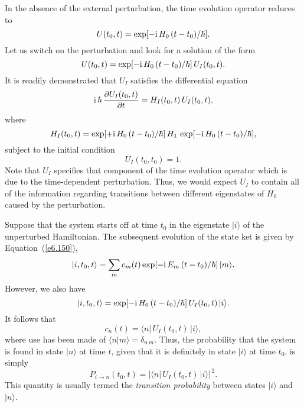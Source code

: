 In the absence of the external perturbation, the time evolution operator
reduces to
\begin{equation}
U(t_0, t) =  \exp[-{\rm i} \, H_0\,(t-t_0)/\hbar].
\end{equation}
Let us switch on the perturbation and look for a solution of the
form
\begin{equation}
U(t_0, t) = \exp[ -{\rm i} \, H_0\,(t-t_0)/\hbar]\, U_I(t_0, t).
\end{equation}
It is readily demonstrated that $U_I$ satisfies the differential
equation
\begin{equation}\label{e6.188}
{\rm i}\, \hbar\, \frac{\partial U_I(t_0, t)}{\partial t} =  H_I(t_0, t)\,
U_I(t_0, t),
\end{equation}
where
\begin{equation}
H_I(t_0,t) = \exp[ +{\rm i} \, H_0\,(t-t_0)/\hbar] \, H_1\,
\exp[ -{\rm i} \, H_0\,(t-t_0)/\hbar],
\end{equation}
subject to the initial condition
\begin{equation}\label{e6.190}
U_I(t_0, t_0) = 1.
\end{equation}
Note that $U_I$ specifies that  component of the time evolution operator
which is due to the time-dependent perturbation. Thus, we would expect $U_I$
to contain all of the information regarding transitions between different
eigenstates of $H_0$ caused by the perturbation. 

Suppose that the system starts off at time $t_0$ in the eigenstate $|i\rangle$ of
the unperturbed Hamiltonian. The subsequent evolution of
the state ket is given by Equation~(\ref{e6.150}),
\begin{equation}
|i, t_0, t\rangle = \sum_m c_m(t) \exp[ -{\rm i} \, E_m\,(t-t_0)/\hbar]\,
|m\rangle.
\end{equation}
However, we also have
\begin{equation}
|i, t_0, t\rangle = \exp[-{\rm i} \, H_0\,(t-t_0)/\hbar]\, U_I(t_0, t)\, |i\rangle.
\end{equation}
It follows that
\begin{equation}\label{e6.193}
c_n(t) = \langle n|\, U_I(t_0, t)\, | i\rangle,
\end{equation}
where use has been made of $\langle n|m \rangle = \delta_{n\,m}$. 
Thus, the probability that the system is found in state $|n\rangle$ at time
$t$, given that it is definitely in state $|i\rangle$ at time $t_0$,
is simply
\begin{equation}
P_{i\rightarrow n} (t_0, t) = |\langle n|\, U_I(t_0, t)\, | i\rangle|^{\,2}.
\end{equation}
This quantity is usually  termed the {\em transition probability}\/ 
between states $|i\rangle$ and $|n\rangle$.

